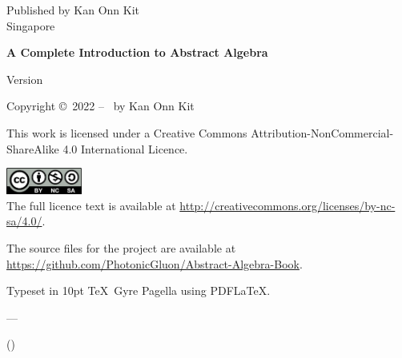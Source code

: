 \clearpage\null\vfill
\thispagestyle{empty}
\begin{minipage}[b]{0.9\textwidth}
    \footnotesize\raggedright
    \setlength{\parskip}{0.5\baselineskip}

    Published by Kan Onn Kit\\
    Singapore
    \vspace{5cm}

    \textbf{A Complete Introduction to Abstract Algebra}\par
    Version \version
    \vspace{0.3cm}

    Copyright \copyright \ 2022 -- \the\year\ by Kan Onn Kit\par
    This work is licensed under a
    Creative Commons Attribution-NonCommercial-ShareAlike 4.0 International Licence.\par
    \includegraphics[width=2.5cm]{images/CC_BY-NC-SA_4.0.png}\\
    The full licence text is available at \url{http://creativecommons.org/licenses/by-nc-sa/4.0/}.\par    
    The source files for the project are available at \url{https://github.com/PhotonicGluon/Abstract-Algebra-Book}.
    \vspace{0.3cm}

    Typeset in 10pt \TeX~Gyre Pagella using PDF\LaTeX.
\end{minipage}

\vspace*{2\baselineskip}
\cleardoublepage

\thispagestyle{empty}
\vspace*{2cm}

\begin{center}
    \Large{\parbox{10cm}{
        \begin{raggedright}
            \Large
            \quotepagetext
            \vspace{0.3cm}
            
            \hfill
            --- \quotepageattribution\\
            \vspace{-0.25cm}
            
            \hfill
            \normalsize
            (\quotepagecitation)
        \end{raggedright}
    }
}
\end{center}

